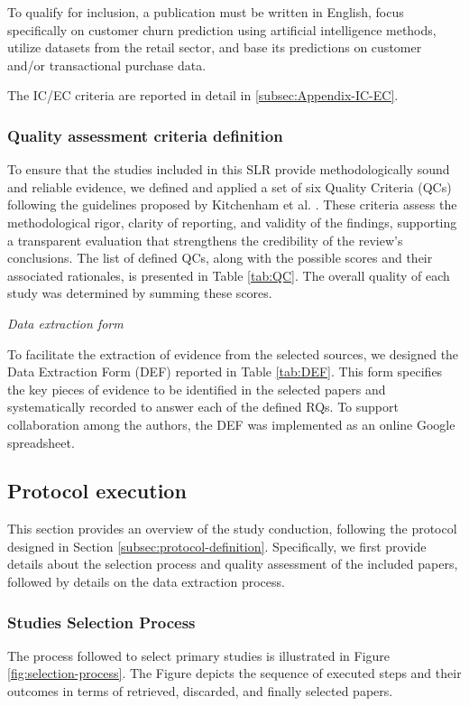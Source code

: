 \documentclass[preprint,12pt]{elsarticle}
\renewcommand{\paragraph}[1]{\vspace{1em}\noindent\textit{#1}\par}
\begin{document}
To qualify for inclusion, a publication must be written in English, focus specifically on customer churn prediction using artificial intelligence methods, utilize datasets from the retail sector, and base its predictions on customer and/or transactional purchase data.

The IC/EC criteria are reported in detail in \ref{subsec:Appendix-IC-EC}.


\subsubsection{Quality assessment criteria definition}
To ensure that the studies included in this SLR provide methodologically sound and reliable evidence, we defined and applied a set of six Quality Criteria (QCs) following the guidelines proposed by Kitchenham et al. \cite{SEGRESS_Kitchenham_2023}. These criteria assess the methodological rigor, clarity of reporting, and validity of the findings, supporting a transparent evaluation that strengthens the credibility of the review’s conclusions.
The list of defined QCs, along with the possible scores and their associated rationales, is presented in Table \ref{tab:QC}. The overall quality of each study was determined by summing these scores. 



\paragraph{Data extraction form}\nopagebreak
To facilitate the extraction of evidence from the selected sources, we designed the Data Extraction Form (DEF) reported in Table \ref{tab:DEF}. This form specifies the key pieces of evidence to be identified in the selected papers and systematically recorded to answer each of the defined RQs. To support collaboration among the authors, the DEF was implemented as an online Google spreadsheet.


\subsection{Protocol execution}
\label{subsec:protocol-execution}
This section provides an overview of the study conduction, following the protocol designed in Section \ref{subsec:protocol-definition}. Specifically, we first provide details about
the selection process and quality assessment of the included papers, followed by details on the data extraction process.


\subsubsection{Studies Selection Process} 
The process followed to select primary studies is illustrated in Figure \ref{fig:selection-process}. The Figure depicts the sequence of executed steps and their outcomes in terms of retrieved, discarded, and finally selected papers. 
\end{document}
